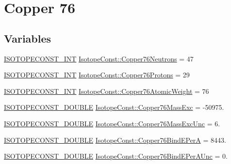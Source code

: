 \hypertarget{group___isotope_const-_copper-_cu76}{}\section{Copper 76}
\label{group___isotope_const-_copper-_cu76}
\subsection*{Variables}
\begin{DoxyCompactItemize}
\item 
\mbox{\hyperlink{group___isotope_const-_macros_ga5f18360b3e99483a35c32d789e62621c}{I\+S\+O\+T\+O\+P\+E\+C\+O\+N\+S\+T\+\_\+\+I\+NT}} \mbox{\hyperlink{group___isotope_const-_copper-_cu76_ga1ab7667528a78de88923a735720492e1}{Isotope\+Const\+::\+Copper76\+Neutrons}} = 47
\item 
\mbox{\hyperlink{group___isotope_const-_macros_ga5f18360b3e99483a35c32d789e62621c}{I\+S\+O\+T\+O\+P\+E\+C\+O\+N\+S\+T\+\_\+\+I\+NT}} \mbox{\hyperlink{group___isotope_const-_copper-_cu76_ga106fd57f9e65108021e1ef5addf8d864}{Isotope\+Const\+::\+Copper76\+Protons}} = 29
\item 
\mbox{\hyperlink{group___isotope_const-_macros_ga5f18360b3e99483a35c32d789e62621c}{I\+S\+O\+T\+O\+P\+E\+C\+O\+N\+S\+T\+\_\+\+I\+NT}} \mbox{\hyperlink{group___isotope_const-_copper-_cu76_gaa5e18e263e0f0339a01a86853de3585d}{Isotope\+Const\+::\+Copper76\+Atomic\+Weight}} = 76
\item 
\mbox{\hyperlink{group___isotope_const-_macros_ga8f45a7272ce02c0b4c65c44636ed719a}{I\+S\+O\+T\+O\+P\+E\+C\+O\+N\+S\+T\+\_\+\+D\+O\+U\+B\+LE}} \mbox{\hyperlink{group___isotope_const-_copper-_cu76_gaacc41bdb93ef1270a9eb960108132c03}{Isotope\+Const\+::\+Copper76\+Mass\+Exc}} = -\/50975.
\item 
\mbox{\hyperlink{group___isotope_const-_macros_ga8f45a7272ce02c0b4c65c44636ed719a}{I\+S\+O\+T\+O\+P\+E\+C\+O\+N\+S\+T\+\_\+\+D\+O\+U\+B\+LE}} \mbox{\hyperlink{group___isotope_const-_copper-_cu76_gaeede656b670ca67d618cb6f5d8c5bdb4}{Isotope\+Const\+::\+Copper76\+Mass\+Exc\+Unc}} = 6.
\item 
\mbox{\hyperlink{group___isotope_const-_macros_ga8f45a7272ce02c0b4c65c44636ed719a}{I\+S\+O\+T\+O\+P\+E\+C\+O\+N\+S\+T\+\_\+\+D\+O\+U\+B\+LE}} \mbox{\hyperlink{group___isotope_const-_copper-_cu76_gaf836a42529df7779f203c487a96c9e8d}{Isotope\+Const\+::\+Copper76\+Bind\+E\+PerA}} = 8443.
\item 
\mbox{\hyperlink{group___isotope_const-_macros_ga8f45a7272ce02c0b4c65c44636ed719a}{I\+S\+O\+T\+O\+P\+E\+C\+O\+N\+S\+T\+\_\+\+D\+O\+U\+B\+LE}} \mbox{\hyperlink{group___isotope_const-_copper-_cu76_ga8d0689bf1336bd117b2920ce2accbce5}{Isotope\+Const\+::\+Copper76\+Bind\+E\+Per\+A\+Unc}} = 0.

\end{DoxyCompactItemize}
